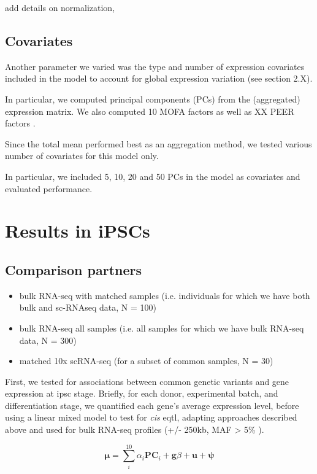 add details on normalization, 

\subsection{Covariates}

Another parameter we varied was the type and number of expression covariates included in the model to account for global expression variation (see section 2.X).

In particular, we computed principal components (PCs) from the (aggregated) expression matrix.
We also computed 10 MOFA factors \cite{argelaguet2018multi} as well as XX PEER factors \cite{stegle2010bayesian,stegle2012using}.

Since the total mean performed best as an aggregation method, we tested various number of covariates for this model only.

In particular, we included 5, 10, 20 and 50 PCs in the model as covariates and evaluated performance.

\section{Results in iPSCs}

\subsection{Comparison partners}

\begin{itemize}
    \item bulk RNA-seq with matched samples (i.e. individuals for which we have both bulk and sc-RNAseq data, N = 100)
    \item bulk RNA-seq all samples (i.e. all samples for which we have bulk RNA-seq data, N = 300)
    \item matched 10x scRNA-seq (for a subset of common samples, N = 30)
\end{itemize}


First, we tested for associations between common genetic variants and gene expression at \gls{ipsc} stage. 
Briefly, for each donor, experimental batch, and differentiation stage, we quantified each gene’s average expression level, before using a linear mixed model to test for \textit{cis} \gls{eqtl}, adapting approaches described above and used for bulk RNA-seq profiles (+/- 250kb, MAF > 5\% \cite{kilpinen2017common}). 

\begin{equation}
    \boldsymbol{\mu} = \sum_i^{10}\alpha_i \mathbf{PC}_i + \mathbf{g}\beta + \mathbf{u} + \boldsymbol{\psi}  
\end{equation}

